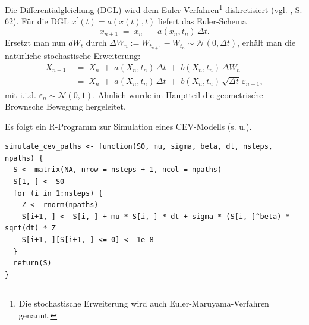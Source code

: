 Die Differentialgleichung (DGL) wird dem Euler-Verfahren\footnote{Die stochastische Erweiterung wird auch Euler-Maruyama-Verfahren genannt.} diskretisiert (vgl. \cite{iacus2008}, S. 62).
Für die DGL $x^\prime(t)=a(x(t),t)$ liefert das Euler‑Schema
$$
x_{n+1} \;=\; x_n \;+\; a(x_n,t_n)\,\Delta t.
$$
Ersetzt man nun $dW_t$ durch $\Delta W_n:=W_{t_{n+1}}-W_{t_n}\sim \mathcal N(0,\Delta t)$, erhält man die natürliche stochastische Erweiterung:
$$
\begin{aligned}
X_{n+1} \;&=\; X_n \;+\; a(X_n,t_n)\,\Delta t \;+\; b(X_n,t_n)\,\Delta W_n \\
\;&=\; X_n \;+\; a(X_n,t_n)\,\Delta t \;+\; b(X_n,t_n)\,\sqrt{\Delta t}\,\varepsilon_{n+1},
\end{aligned}
$$
mit i.i.d. $\varepsilon_{n}\sim\mathcal N(0,1)$. 
Ähnlich wurde im Hauptteil die geometrische Brownsche Bewegung hergeleitet.

\begin{bsp}[Implementierung]
Es folgt ein R-Programm zur Simulation eines CEV-Modells (s. u.).

\begin{lstlisting}
simulate_cev_paths <- function(S0, mu, sigma, beta, dt, nsteps, npaths) {
  S <- matrix(NA, nrow = nsteps + 1, ncol = npaths)
  S[1, ] <- S0
  for (i in 1:nsteps) {
    Z <- rnorm(npaths)
    S[i+1, ] <- S[i, ] + mu * S[i, ] * dt + sigma * (S[i, ]^beta) * sqrt(dt) * Z
    S[i+1, ][S[i+1, ] <= 0] <- 1e-8
  }
  return(S)
}
\end{lstlisting}

\end{bsp}

